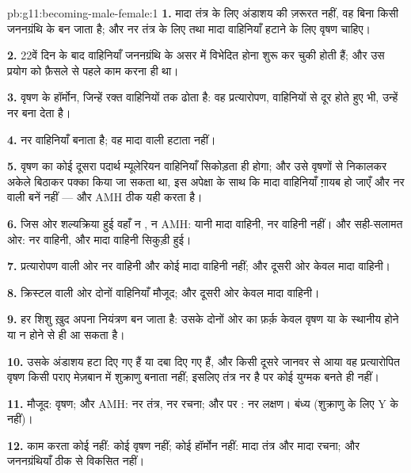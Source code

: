 \begin{solution}{pb:g11:becoming-male-female:1}
\textbf{1.} मादा तंत्र के लिए अंडाशय की ज़रूरत नहीं, वह बिना किसी
जननग्रंथि के बन जाता है; और नर तंत्र के लिए तथा मादा वाहिनियाँ हटाने के लिए
वृषण चाहिए।

\textbf{2.} 22वें दिन के बाद वाहिनियाँ जननग्रंथि के असर में विभेदित होना
शुरू कर चुकी होती हैं; और उस प्रयोग को फ़ैसले से पहले काम करना ही था।

\textbf{3.} वृषण के हॉर्मोन, जिन्हें रक्त वाहिनियों तक ढोता है: वह
प्रत्यारोपण, वाहिनियों से दूर होते हुए भी, उन्हें नर बना देता है।

\textbf{4.}  नर वाहिनियाँ बनाता है; वह मादा वाली हटाता नहीं।

\textbf{5.} वृषण का कोई दूसरा पदार्थ म्यूलेरियन वाहिनियाँ सिकोड़ता ही
होगा; और उसे वृषणों से निकालकर अकेले बिठाकर पक्का किया जा सकता था, इस
अपेक्षा के साथ कि मादा वाहिनियाँ ग़ायब हो जाएँ और नर वाली बनें नहीं ---
और AMH ठीक यही करता है।

\textbf{6.} जिस ओर शल्यक्रिया हुई वहाँ न , न AMH: यानी मादा
वाहिनी, नर वाहिनी नहीं। और सही-सलामत ओर: नर वाहिनी, और मादा वाहिनी
सिकुड़ी हुई।

\textbf{7.} प्रत्यारोपण वाली ओर नर वाहिनी और कोई मादा वाहिनी नहीं; और
दूसरी ओर केवल मादा वाहिनी।

\textbf{8.} क्रिस्टल वाली ओर दोनों वाहिनियाँ मौजूद; और दूसरी ओर केवल मादा
वाहिनी।

\textbf{9.} हर शिशु ख़ुद अपना नियंत्रण बन जाता है: उसके दोनों ओर का फ़र्क़
केवल वृषण या  के स्थानीय होने या न होने से ही आ सकता है।

\textbf{10.} उसके अंडाशय हटा दिए गए हैं या दबा दिए गए हैं, और किसी दूसरे
जानवर से आया वह प्रत्यारोपित वृषण किसी पराए मेज़बान में शुक्राणु बनाता
नहीं; इसलिए तंत्र नर है पर कोई युग्मक बनते ही नहीं।

\textbf{11.}  मौजूद: वृषण;  और AMH: नर तंत्र, नर रचना; और
 पर : नर लक्षण। बंध्य (शुक्राणु के लिए Y के  नहीं)।

\textbf{12.} काम करता कोई  नहीं: कोई वृषण नहीं; कोई हॉर्मोन नहीं: मादा
तंत्र और मादा रचना; और जननग्रंथियाँ ठीक से विकसित नहीं।


\end{solution}
